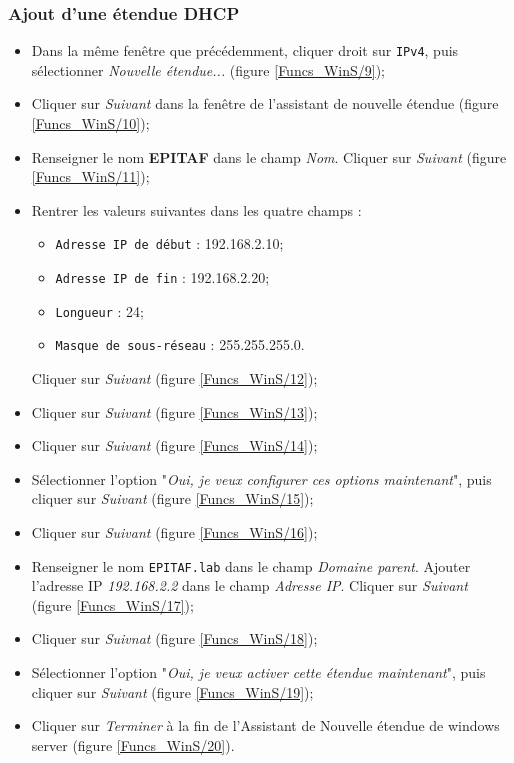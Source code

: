 \subsubsection{Ajout d'une étendue DHCP}

\begin{itemize}
    \item Dans la même fenêtre que précédemment, cliquer droit sur \texttt{IPv4}, puis sélectionner \textit{Nouvelle étendue...} (figure \ref{Funcs_WinS/9});
    \item Cliquer sur \textit{Suivant} dans la fenêtre de l'assistant de nouvelle étendue (figure \ref{Funcs_WinS/10});
    \item Renseigner le nom \textbf{EPITAF} dans le champ \textit{Nom}. Cliquer sur \textit{Suivant} (figure \ref{Funcs_WinS/11});
    \item Rentrer les valeurs suivantes dans les quatre champs :
    \begin{itemize}
        \item \texttt{Adresse IP de début} : 192.168.2.10;
        \item \texttt{Adresse IP de fin} : 192.168.2.20;
        \item \texttt{Longueur} : 24;
        \item \texttt{Masque de sous-réseau} : 255.255.255.0.
    \end{itemize}
    Cliquer sur \textit{Suivant} (figure \ref{Funcs_WinS/12});
    \item Cliquer sur \textit{Suivant} (figure \ref{Funcs_WinS/13});
    \item Cliquer sur \textit{Suivant} (figure \ref{Funcs_WinS/14});
    \item Sélectionner l'option "\textit{Oui, je veux configurer ces options maintenant}", puis cliquer sur \textit{Suivant} (figure \ref{Funcs_WinS/15});
    \item Cliquer sur \textit{Suivant} (figure \ref{Funcs_WinS/16});
    \item Renseigner le nom \texttt{EPITAF.lab} dans le champ \textit{Domaine parent}. Ajouter l'adresse IP \textit{192.168.2.2} dans le champ \textit{Adresse IP}. Cliquer sur \textit{Suivant} (figure \ref{Funcs_WinS/17});
    \item Cliquer sur \textit{Suivnat} (figure \ref{Funcs_WinS/18});
    \item Sélectionner l'option "\textit{Oui, je veux activer cette étendue maintenant}", puis cliquer sur \textit{Suivant} (figure \ref{Funcs_WinS/19});
    \item Cliquer sur \textit{Terminer} à la fin de l'Assistant de Nouvelle étendue de windows server (figure \ref{Funcs_WinS/20}).
\end{itemize}


